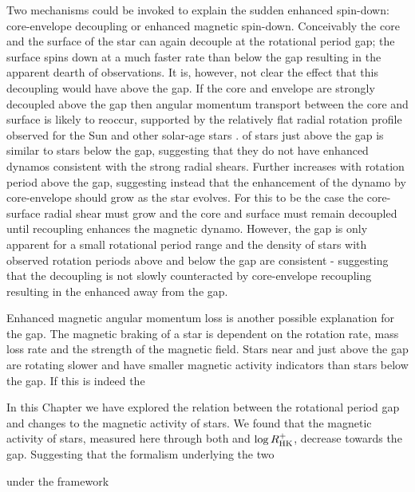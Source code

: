 Two mechanisms could be invoked to explain the sudden enhanced spin-down: core-envelope decoupling or enhanced magnetic spin-down.
Conceivably the core and the surface of the star can again decouple at the rotational period gap; the surface spins down at a much faster rate than below the gap resulting in the apparent dearth of observations.
It is, however, not clear the effect that this decoupling would have above the gap.
If the core and envelope are strongly decoupled above the gap then angular momentum transport between the core and surface is likely to reoccur, supported by the relatively flat radial rotation profile observed for the Sun and other solar-age stars \citep{hall}.
\rper{} of stars just above the gap is similar to stars below the gap, suggesting that they do not have enhanced dynamos consistent with the strong radial shears.
Further \rper{} increases with rotation period above the gap, suggesting instead that the enhancement of the dynamo by core-envelope should grow as the star evolves.
For this to be the case the core-surface radial shear must grow and the core and surface must remain decoupled until recoupling enhances the magnetic dynamo.
However, the gap is only apparent for a small rotational period range and the density of stars with observed rotation periods above and below the gap are consistent - suggesting that the decoupling is not slowly counteracted by core-envelope recoupling resulting in the enhanced \rper{} away from the gap.

Enhanced magnetic angular momentum loss is another possible explanation for the gap.
The magnetic braking of a star is dependent on the rotation rate, mass loss rate and the strength of the magnetic field.
Stars near and just above the gap are rotating slower and have smaller magnetic activity indicators than stars below the gap.
If this is indeed the



In this Chapter we have explored the relation between the rotational period gap and changes to the magnetic activity of stars.
We found that the magnetic activity of stars, measured here through both \rper{} and  $\log R^{+}_{\rm{HK}}$, decrease towards the gap.
Suggesting that the formalism underlying the two

under the framework


